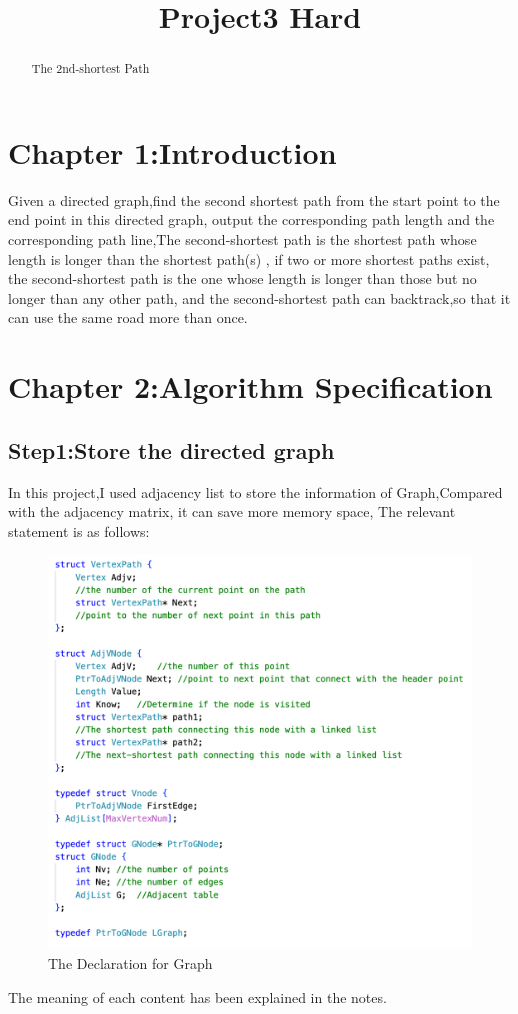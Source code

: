\documentclass[12pt]{article}
\title{Project3 Hard}
\begin{document}
\maketitle

\begin{abstract}
    The 2nd-shortest Path
\end{abstract}

\section*{Chapter 1:Introduction}
    Given a directed graph,find the second shortest path from the start point to the end point in this directed graph,
output the corresponding path length and the corresponding path line,The second-shortest path is the shortest path whose length is longer than the shortest path(s) ,
if two or more shortest paths exist, the second-shortest path is the one whose length is longer than those but no longer than any other path,
and the second-shortest path can backtrack,so that it can use the same road more than once.
\section*{Chapter 2:Algorithm Specification}

\subsection*{Step1:Store the directed graph}
    In this project,I used adjacency list to store the information of Graph,Compared with the adjacency matrix, it can save more memory space,
The relevant statement is as follows:
\begin{figure}[H]
	\centering
	\includegraphics[width=1\textwidth]{1.png}
	\caption{\label{pr}The Declaration for Graph}
	\end{figure}
The meaning of each content has been explained in the notes.
\end{document}
